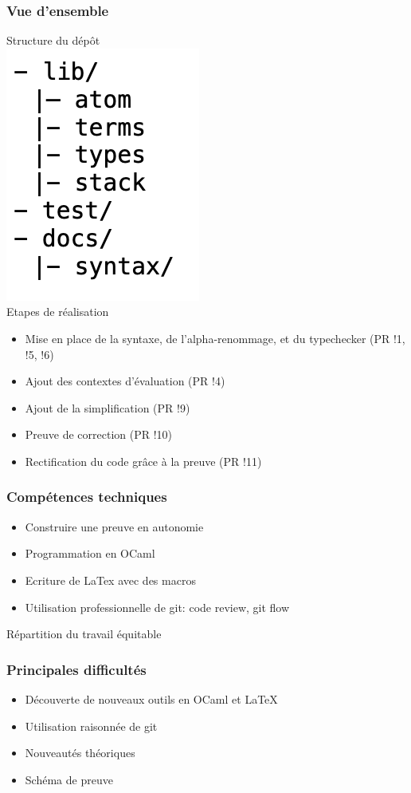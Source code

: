 \documentclass{beamer}
\begin{document}
\begin{frame}
\frametitle{Vue d’ensemble}
Structure du dépôt \\
\includegraphics[scale=0.5]{pics/repo_structure.png} \\
Etapes de réalisation \\
\begin{itemize}
    \item Mise en place de la syntaxe, de l’alpha-renommage, et du typechecker (PR !1, !5, !6)
    \item Ajout des contextes d’évaluation (PR !4)
    \item Ajout de la simplification (PR !9)
    \item Preuve de correction (PR !10)
    \item Rectification du code grâce à la preuve (PR !11)
\end{itemize}
\end{frame}
\begin{frame}
\frametitle{Compétences techniques}
\begin{itemize}
    \item Construire une preuve en autonomie
    \item Programmation en OCaml
    \item Ecriture de LaTex avec des macros
    \item Utilisation professionnelle de git: code review, git flow
\end{itemize}
Répartition du travail équitable
\end{frame}
\begin{frame}
\frametitle{Principales difficultés}
\begin{itemize}
    \item Découverte de nouveaux outils en OCaml et LaTeX
    \item Utilisation raisonnée de git
    \item Nouveautés théoriques
    \item Schéma de preuve
\end{itemize}
\end{frame}
\end{document}
